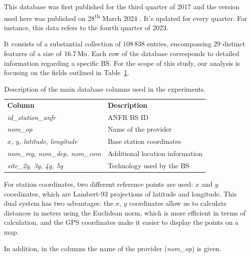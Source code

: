 \documentclass[lettersize,journal,english]{IEEEtran}
\begin{document}
        This database was first published for the third quarter of 2017 and the version used here was published on 28\textsuperscript{th} March 2024 \cite{main_database_hist}.
        It's updated for every quarter. For instance, this data refers to the fourth quarter of 2023.

        It consists of a substantial collection of $108\,838$ entries, encompassing $29$ distinct features of a size of $\unit[16.7]{Mo}$.
        Each row of the database corresponds to detailed information regarding a specific BS. For the scope of this study, our analysis is focusing on the fields outlined in Table~\ref{table:data_columns}.
        \begin{table}
            \centering
            \caption{Description of the main database columns used in the experiments.}
            \label{table:data_columns}
            \begin{tabular}{ll}
                \toprule
                \textbf{Column} & \textbf{Description} \\
                \cmidrule(lr){1-2}
                \textsl{id\_station\_anfr} & ANFR BS ID \\ 
                \textsl{nom\_op} & Name of the provider \\
                \textsl{$x$, $y$, latitude, longitude} & Base station coordinates \\ 
                \textsl{nom\_reg, nom\_dep, nom\_com} & Additional location information \\  
                \textsl{site\_2g, 3g, 4g, 5g} & Technology used by the BS \\ 
                \bottomrule
            \end{tabular}
        \end{table}

        For station coordinates, two different reference points are used: $x$ and $y$ coordinates, which are Lambert-93 projections of latitude and longitude.
        This dual system has two advantages: the $x$, $y$ coordinates allow us to calculate distances in meters using the Euclidean norm, which is more efficient in terms of calculation, and the GPS coordinates make it easier to display the points on a map.

        In addition, in the columns the name of the provider (\textsl{nom\_op}) is given.
\end{document}
